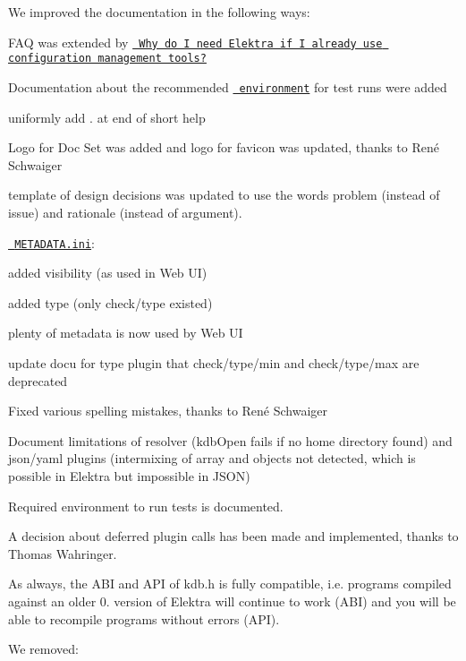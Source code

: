 We improved the documentation in the following ways\+:


\begin{DoxyItemize}
\item F\+AQ was extended by \href{https://www.libelektra.org/docgettingstarted/faq}{\texttt{ Why do I need Elektra if I already use configuration management tools?}}
\item Documentation about the recommended \href{https://www.libelektra.org/devgettingstarted/testing}{\texttt{ environment}} for test runs were added
\item uniformly add {\ttfamily .} at end of short help
\item Logo for Doc Set was added and logo for favicon was updated, thanks to René Schwaiger
\item template of design decisions was updated to use the words problem (instead of issue) and rationale (instead of argument).
\item \href{https://www.libelektra.org/docgettingstarted/meta-specification}{\texttt{ M\+E\+T\+A\+D\+A\+T\+A.\+ini}}\+:
\begin{DoxyItemize}
\item added visibility (as used in Web UI)
\item added type (only check/type existed)
\item plenty of metadata is now used by Web UI
\end{DoxyItemize}
\item update docu for type plugin that {\ttfamily check/type/min} and {\ttfamily check/type/max} are deprecated
\item Fixed various spelling mistakes, thanks to René Schwaiger
\item Document limitations of resolver (kdb\+Open fails if no home directory found) and json/yaml plugins (intermixing of array and objects not detected, which is possible in Elektra but impossible in J\+S\+ON)
\item Required environment to run tests is documented.
\item A decision about deferred plugin calls has been made and implemented, thanks to Thomas Wahringer.
\end{DoxyItemize}

As always, the A\+BI and A\+PI of kdb.\+h is fully compatible, i.\+e. programs compiled against an older 0. version of Elektra will continue to work (A\+BI) and you will be able to recompile programs without errors (A\+PI).

We removed\+:


